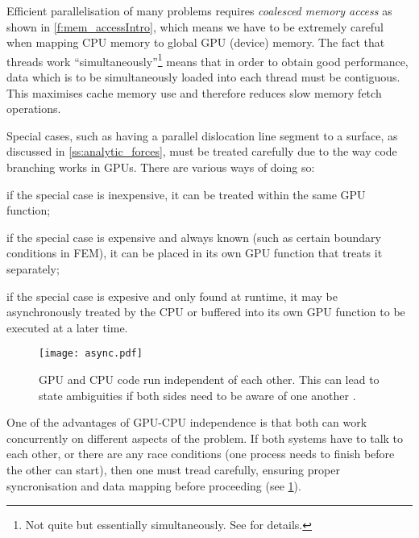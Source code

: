 Efficient parallelisation of many problems requires \emph{coalesced memory access} as shown in \cref{f:mem_accessIntro}, which means we have to be extremely careful when mapping CPU memory to global GPU (device) memory. The fact that threads work ``simultaneously''\footnote{Not quite but essentially simultaneously. See \cite{nvidia} for details.} means that in order to obtain good performance, data which is to be simultaneously loaded into each thread must be contiguous. This maximises cache memory use and therefore reduces slow memory fetch operations.

Special cases, such as having a parallel dislocation line segment to a surface, as discussed in \cref{ss:analytic_forces}, must be treated carefully due to the way code branching works in GPUs. There are various ways of doing so:
\begin{inparaenum}[\itshape 1\upshape)]
    \item if the special case is inexpensive, it can be treated within the same GPU function;
    \item if the special case is expensive and always known (such as certain boundary conditions in FEM), it can be placed in its own GPU function that treats it separately;
    \item if the special case is expesive and only found at runtime, it may be asynchronously treated by the CPU or buffered into its own GPU function to be executed at a later time.
\end{inparaenum}

\begin{figure}
    \centering
    \texttt{[image: async.pdf]}
    \caption[GPU and CPU asynchronous execution.]{GPU and CPU code run independent of each other. This can lead to state ambiguities if both sides need to be aware of one another \cite{nvidia}.}
    \label{f:async_gpu_cpu}
\end{figure}
One of the advantages of GPU-CPU independence is that both can work concurrently on different aspects of the problem. If both systems have to talk to each other, or there are any race conditions (one process needs to finish before the other can start), then one must tread carefully, ensuring proper syncronisation and data mapping before proceeding (see \cref{f:async_gpu_cpu}).

